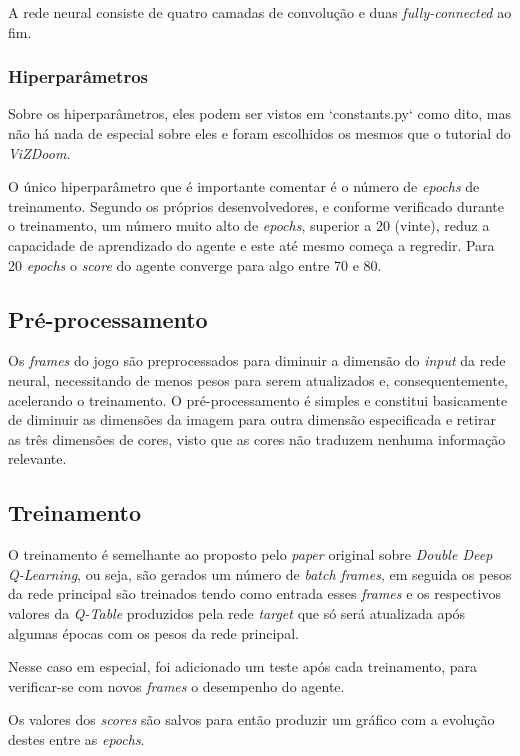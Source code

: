 \documentclass[12pt]{article}
\begin{document}
A rede neural consiste de quatro camadas de convolução e duas \textit{fully-connected} ao fim.

\subsubsection{Hiperparâmetros}

Sobre os hiperparâmetros, eles podem ser vistos em `constants.py` como dito, mas não há nada de especial sobre eles e foram escolhidos os mesmos que o tutorial do \textit{ViZDoom}.

O único hiperparâmetro que é importante comentar é o número de \textit{epochs} de treinamento. Segundo os próprios desenvolvedores, e conforme verificado durante o treinamento, um número muito alto de \textit{epochs}, superior a 20 (vinte), reduz a capacidade de aprendizado do agente e este até mesmo começa a regredir. Para 20 \textit{epochs} o \textit{score} do agente converge para algo entre 70 e 80.

\subsection{Pré-processamento}

Os \textit{frames} do jogo são preprocessados para diminuir a dimensão do \textit{input} da rede neural, necessitando de menos pesos para serem atualizados e, consequentemente, acelerando o treinamento. O pré-processamento é simples e constitui basicamente de diminuir as dimensões da imagem para outra dimensão especificada e retirar as três dimensões de cores, visto que as cores não traduzem nenhuma informação relevante.

\subsection{Treinamento}

O treinamento é semelhante ao proposto pelo \textit{paper} original sobre \textit{Double Deep Q-Learning}, ou seja, são gerados um número de \textit{batch frames}, em seguida os pesos da rede principal são treinados tendo como entrada esses \textit{frames} e os respectivos valores da \textit{Q-Table} produzidos pela rede \textit{target} que só será atualizada após algumas épocas com os pesos da rede principal.

Nesse caso em especial, foi adicionado um teste após cada treinamento, para verificar-se com novos \textit{frames} o desempenho do agente.

Os valores dos \textit{scores} são salvos para então produzir um gráfico com a evolução destes entre as \textit{epochs}.
\end{document}
